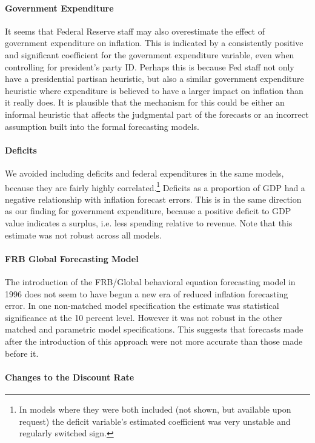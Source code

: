 \documentclass[a4paper]{article}\usepackage{graphicx, color}
\begin{document}
\paragraph{Government Expenditure}

It seems that Federal Reserve staff may also overestimate the effect of government expenditure on inflation. This is indicated by a consistently positive and significant coefficient for the government expenditure variable, even when controlling for president's party ID. Perhaps this is because Fed staff not only have a presidential partisan heuristic, but also a similar government expenditure heuristic where expenditure is believed to have a larger impact on inflation than it really does. It is plausible that the mechanism for this could be either an informal heuristic that affects the judgmental part of the forecasts or an incorrect assumption built into the formal forecasting models.

\paragraph{Deficits} We avoided including deficits and federal expenditures in the same models, because they are fairly highly correlated.\footnote{In models where they were both included (not shown, but available upon request) the deficit variable's estimated coefficient was very unstable and regularly switched sign.} Deficits as a proportion of GDP had a negative relationship with inflation forecast errors. This is in the same direction as our finding for government expenditure, because a positive deficit to GDP value indicates a surplus, i.e. less spending relative to revenue. Note that this estimate was not robust across all models.

\paragraph{FRB Global Forecasting Model}

The introduction of the FRB/Global behavioral equation forecasting model in 1996 does not seem to have begun a new era of reduced inflation forecasting error. In one non-matched model specification the estimate was statistical significance at the 10 percent level. However it was not robust in the other matched and parametric model specifications. This suggests that forecasts made after the introduction of this approach were not more accurate than those made before it. 

\paragraph{Changes to the Discount Rate}
\end{document}
